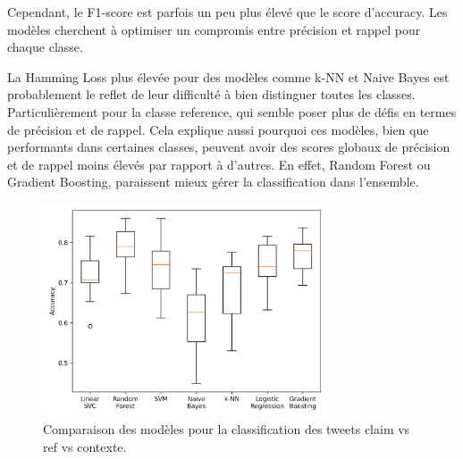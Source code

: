 Cependant, le F1-score est parfois un peu plus élevé que le score d'accuracy.
Les modèles cherchent à optimiser un compromis entre précision et rappel pour chaque classe.

La Hamming Loss plus élevée pour des modèles comme k-NN et Naive Bayes est probablement le reflet de leur difficulté à bien distinguer toutes les classes.
Particulièrement pour la classe reference, qui semble poser plus de défis en termes de précision et de rappel.
Cela explique aussi pourquoi ces modèles, bien que performants dans certaines classes, peuvent avoir des scores globaux de précision et de rappel moins élevés par rapport à d'autres.
En effet, Random Forest ou Gradient Boosting, paraissent mieux gérer la classification dans l’ensemble.

\begin{figure}[H]
    \centering
    \includegraphics[width=0.75\textwidth]{images/model_comparison_3}
    \caption{Comparaison des modèles pour la classification des tweets claim vs ref vs contexte.}
    \label{fig:model_comparison_clm_ref_context}
\end{figure}


